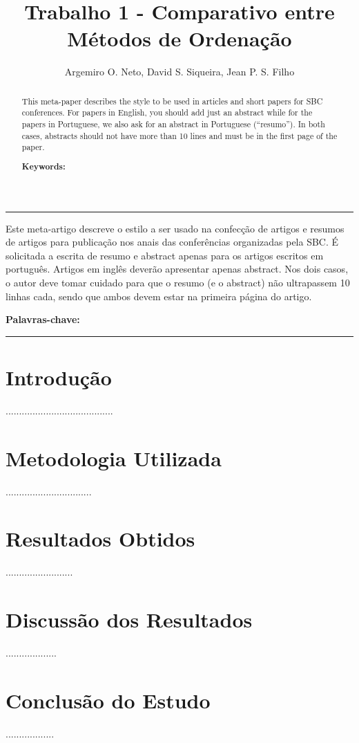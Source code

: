\documentclass[12pt]{article}
\title{Trabalho 1 - Comparativo entre Métodos de Ordenação}
\author{Argemiro O. Neto\inst{1}, David S. Siqueira\inst{2}, Jean P. S. Filho\inst{3} }
\begin{document}
 

\maketitle
\thispagestyle{firststyle}




\hrule

\begin{resumo} 
  Este meta-artigo descreve o estilo a ser usado na confecção de artigos e
  resumos de artigos para publicação nos anais das conferências organizadas
  pela SBC. É solicitada a escrita de resumo e abstract apenas para os artigos
  escritos em português. Artigos em inglês deverão apresentar apenas abstract.
  Nos dois casos, o autor deve tomar cuidado para que o resumo (e o abstract)
  não ultrapassem 10 linhas cada, sendo que ambos devem estar na primeira
  página do artigo.
  
  \textbf{Palavras-chave: }
\end{resumo}


\begin{abstract}
  This meta-paper describes the style to be used in articles and short papers
  for SBC conferences. For papers in English, you should add just an abstract
  while for the papers in Portuguese, we also ask for an abstract in
  Portuguese (``resumo''). In both cases, abstracts should not have more than  10 lines and must be in the first page of the paper.
  
  \textbf{Keywords: }
\end{abstract}


\hrule
     
\section{Introdução}

........................................

\section{Metodologia Utilizada} \label{sec:firstpage}

................................

\section{Resultados Obtidos}\label{sec:sections-paragraphs}

.........................

\section{Discussão dos Resultados}\label{sec:figs}

...................

\section{Conclusão do Estudo}

..................

\end{document}
